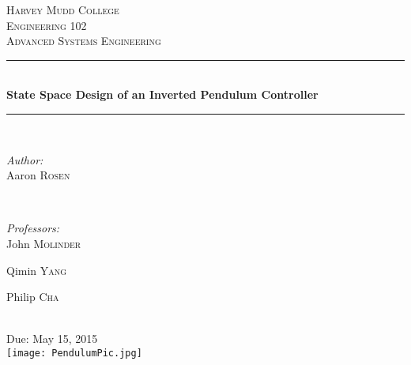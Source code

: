 \documentclass[12pt]{article}
\begin{document}
\begin{titlepage}

\newcommand{\HRule}{\rule{\linewidth}{0.5mm}} %

\center %


\textsc{\LARGE Harvey Mudd College}\\[1.5cm] %
\textsc{\large Engineering 102}\\[0.5cm] %
\textsc{\Large Advanced Systems Engineering}\\[0.5cm]  %

\HRule \\[0.4cm]
{ \huge \bfseries State Space Design of an Inverted Pendulum Controller}\\[0.4cm] %
\HRule \\[1.5cm]
 

\begin{minipage}{0.4\textwidth}
\begin{flushleft} \large
\emph{Author:}\\
Aaron \textsc{Rosen}

\end{flushleft}
\end{minipage}
~
\begin{minipage}{0.4\textwidth}
\begin{flushright} \large
\emph{Professors:} \\
John \textsc{Molinder} %

Qimin \textsc{Yang}

Philip \textsc{Cha}
\end{flushright}
\end{minipage}\\[1cm]



{\large Due: May 15, 2015}\\[1cm] 



\texttt{[image: PendulumPic.jpg]} 

\vfill %

\end{titlepage}



\end{document}
